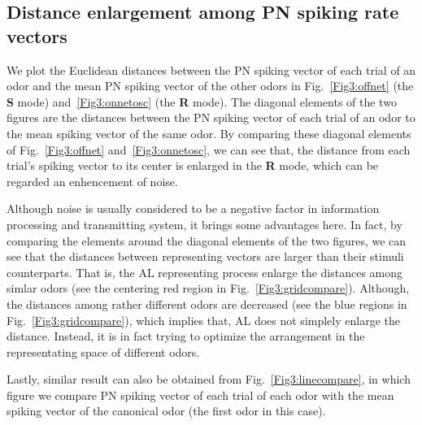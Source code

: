 \documentclass[12pt, a4paper]{article}
\begin{document}
\subsection{Distance enlargement among PN spiking rate vectors} \label{Sect:distance}
We plot the Euclidean distances between the PN spiking vector of each trial of an odor and the mean PN spiking vector of the other odors in Fig.~\ref{Fig3:offnet} (the {\bf S} mode) and~\ref{Fig3:onnetosc} (the {\bf R} mode). The diagonal elements of the two figures are the distances between the PN spiking vector of each trial of an odor to the mean spiking vector of the same odor. By comparing these diagonal elements of Fig.~\ref{Fig3:offnet} and~\ref{Fig3:onnetosc}, we can see that, the distance from each trial's spiking vector to its center is enlarged in the {\bf R} mode, which can be regarded an enhencement of noise.

Although noise is usually considered to be a negative factor in information processing and transmitting system, it brings some advantages here. In fact, by comparing the elements around the diagonal elements of the two figures, we can see that the distances between representing vectors are larger than their stimuli counterparts. That is, the AL representing process enlarge the distances among simlar odors (see the centering red region in Fig.~\ref{Fig3:gridcompare}). Although, the distances among rather different odors are decreased (see the blue regions in Fig.~\ref{Fig3:gridcompare}), which implies that, AL does not simplely enlarge the distance. Instead, it is in fact trying to optimize the arrangement in the representating space of different odors.

Lastly, similar result can also be obtained from Fig.~\ref{Fig3:linecompare}, in which figure we compare PN spiking vector of each trial of each odor with the mean spiking vector of the canonical odor (the first odor in this case).
\end{document}
